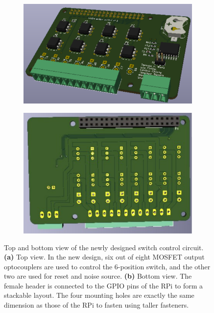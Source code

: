 \begin{figure}
	\centering
	\begin{subfigure}[t]{0.52\textwidth}
		\centering
		\includegraphics[width=\linewidth]{Figures/Top} 
		\caption{} \label{Fig:Top}
	\end{subfigure}
	\hfill
	\begin{subfigure}[t]{0.45\textwidth}
		\centering
		\includegraphics[width=\linewidth]{Figures/Bottom}
		\caption{} \label{Fig:Bottom}
	\end{subfigure}
	\caption{Top and bottom view of the newly designed switch control circuit. {\bf (a)} Top view. In the new design, six out of eight MOSFET output optocouplers are used to control the 6-position switch, and the other two are used for reset and noise source. {\bf (b)} Bottom view. The female header is connected to the GPIO pins of the RPi to form a stackable layout. The four mounting holes are exactly the same dimension as those of the RPi to fasten using taller fasteners.}
	\label{Fig:control}
\end{figure}

